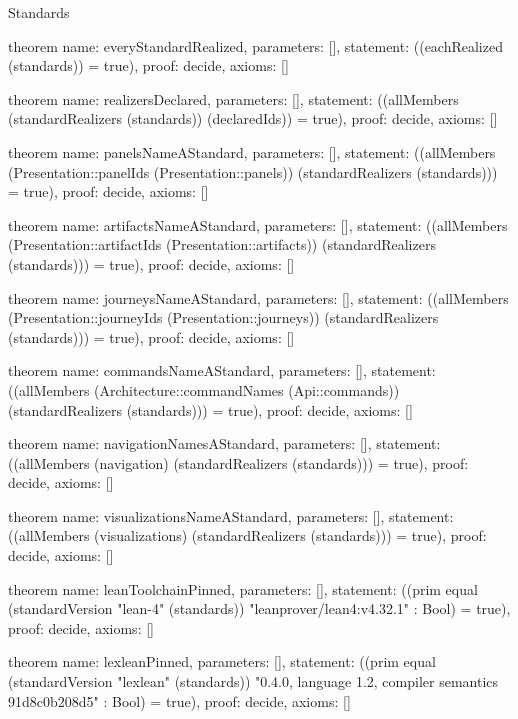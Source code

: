 \begin{lexlean}{Standards}
\begin{semanticmodule}
theorem{
  name: everyStandardRealized,
  parameters: [],
  statement: ((eachRealized (standards)) = true),
  proof: decide{},
  axioms: []
}

theorem{
  name: realizersDeclared,
  parameters: [],
  statement: ((allMembers (standardRealizers (standards)) (declaredIds)) = true),
  proof: decide{},
  axioms: []
}

theorem{
  name: panelsNameAStandard,
  parameters: [],
  statement: ((allMembers (Presentation::panelIds (Presentation::panels)) (standardRealizers (standards))) = true),
  proof: decide{},
  axioms: []
}

theorem{
  name: artifactsNameAStandard,
  parameters: [],
  statement: ((allMembers (Presentation::artifactIds (Presentation::artifacts)) (standardRealizers (standards))) = true),
  proof: decide{},
  axioms: []
}

theorem{
  name: journeysNameAStandard,
  parameters: [],
  statement: ((allMembers (Presentation::journeyIds (Presentation::journeys)) (standardRealizers (standards))) = true),
  proof: decide{},
  axioms: []
}

theorem{
  name: commandsNameAStandard,
  parameters: [],
  statement: ((allMembers (Architecture::commandNames (Api::commands)) (standardRealizers (standards))) = true),
  proof: decide{},
  axioms: []
}

theorem{
  name: navigationNamesAStandard,
  parameters: [],
  statement: ((allMembers (navigation) (standardRealizers (standards))) = true),
  proof: decide{},
  axioms: []
}

theorem{
  name: visualizationsNameAStandard,
  parameters: [],
  statement: ((allMembers (visualizations) (standardRealizers (standards))) = true),
  proof: decide{},
  axioms: []
}

theorem{
  name: leanToolchainPinned,
  parameters: [],
  statement: ((prim equal (standardVersion "lean-4" (standards)) "leanprover/lean4:v4.32.1" : Bool) = true),
  proof: decide{},
  axioms: []
}

theorem{
  name: lexleanPinned,
  parameters: [],
  statement: ((prim equal (standardVersion "lexlean" (standards)) "0.4.0, language 1.2, compiler semantics 91d8c0b208d5" : Bool) = true),
  proof: decide{},
  axioms: []
}
\end{semanticmodule}
\end{lexlean}
